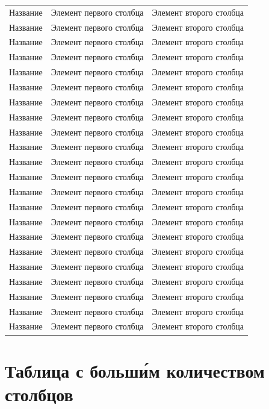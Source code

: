 \begin{longtable}{|l|c|c|}
Название & Элемент первого столбца & Элемент второго столбца \\
Название & Элемент первого столбца & Элемент второго столбца \\
Название & Элемент первого столбца & Элемент второго столбца \\
Название & Элемент первого столбца & Элемент второго столбца \\
Название & Элемент первого столбца & Элемент второго столбца \\
Название & Элемент первого столбца & Элемент второго столбца \\
Название & Элемент первого столбца & Элемент второго столбца \\
Название & Элемент первого столбца & Элемент второго столбца \\
Название & Элемент первого столбца & Элемент второго столбца \\
Название & Элемент первого столбца & Элемент второго столбца \\
Название & Элемент первого столбца & Элемент второго столбца \\
Название & Элемент первого столбца & Элемент второго столбца \\
Название & Элемент первого столбца & Элемент второго столбца \\
Название & Элемент первого столбца & Элемент второго столбца \\
Название & Элемент первого столбца & Элемент второго столбца \\
Название & Элемент первого столбца & Элемент второго столбца \\
Название & Элемент первого столбца & Элемент второго столбца \\
Название & Элемент первого столбца & Элемент второго столбца \\
Название & Элемент первого столбца & Элемент второго столбца \\
Название & Элемент первого столбца & Элемент второго столбца \\
Название & Элемент первого столбца & Элемент второго столбца \\
Название & Элемент первого столбца & Элемент второго столбца \\
\end{longtable}

\chapter{Таблица с больш\'{и}м количеством столбцов}
\label{app:gtable}

